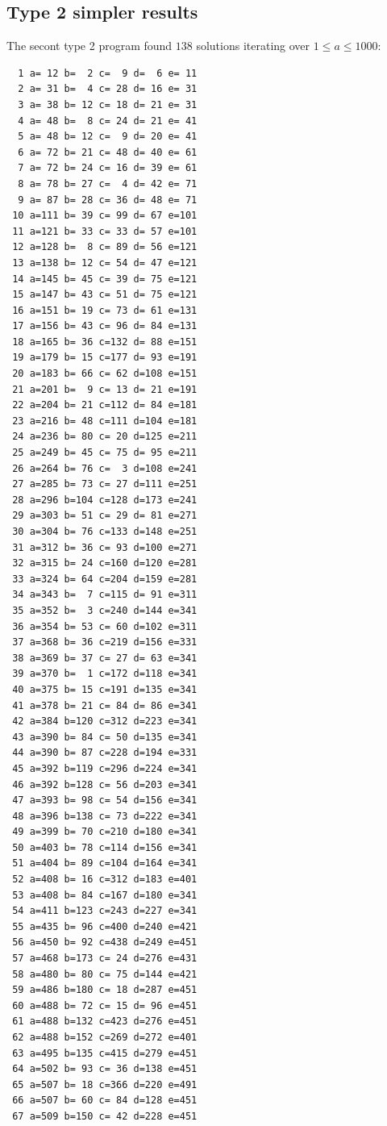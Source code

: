 \documentclass[11pt]{article}
\begin{document}
\subsection{Type 2 simpler results}
The secont type 2 program found $138$ solutions iterating over $1 \leq a \leq 1000$: 
\begin{lstlisting}
  1 a= 12 b=  2 c=  9 d=  6 e= 11
  2 a= 31 b=  4 c= 28 d= 16 e= 31
  3 a= 38 b= 12 c= 18 d= 21 e= 31
  4 a= 48 b=  8 c= 24 d= 21 e= 41
  5 a= 48 b= 12 c=  9 d= 20 e= 41
  6 a= 72 b= 21 c= 48 d= 40 e= 61
  7 a= 72 b= 24 c= 16 d= 39 e= 61
  8 a= 78 b= 27 c=  4 d= 42 e= 71
  9 a= 87 b= 28 c= 36 d= 48 e= 71
 10 a=111 b= 39 c= 99 d= 67 e=101
 11 a=121 b= 33 c= 33 d= 57 e=101
 12 a=128 b=  8 c= 89 d= 56 e=121
 13 a=138 b= 12 c= 54 d= 47 e=121
 14 a=145 b= 45 c= 39 d= 75 e=121
 15 a=147 b= 43 c= 51 d= 75 e=121
 16 a=151 b= 19 c= 73 d= 61 e=131
 17 a=156 b= 43 c= 96 d= 84 e=131
 18 a=165 b= 36 c=132 d= 88 e=151
 19 a=179 b= 15 c=177 d= 93 e=191
 20 a=183 b= 66 c= 62 d=108 e=151
 21 a=201 b=  9 c= 13 d= 21 e=191
 22 a=204 b= 21 c=112 d= 84 e=181
 23 a=216 b= 48 c=111 d=104 e=181
 24 a=236 b= 80 c= 20 d=125 e=211
 25 a=249 b= 45 c= 75 d= 95 e=211
 26 a=264 b= 76 c=  3 d=108 e=241
 27 a=285 b= 73 c= 27 d=111 e=251
 28 a=296 b=104 c=128 d=173 e=241
 29 a=303 b= 51 c= 29 d= 81 e=271
 30 a=304 b= 76 c=133 d=148 e=251
 31 a=312 b= 36 c= 93 d=100 e=271
 32 a=315 b= 24 c=160 d=120 e=281
 33 a=324 b= 64 c=204 d=159 e=281
 34 a=343 b=  7 c=115 d= 91 e=311
 35 a=352 b=  3 c=240 d=144 e=341
 36 a=354 b= 53 c= 60 d=102 e=311
 37 a=368 b= 36 c=219 d=156 e=331
 38 a=369 b= 37 c= 27 d= 63 e=341
 39 a=370 b=  1 c=172 d=118 e=341
 40 a=375 b= 15 c=191 d=135 e=341
 41 a=378 b= 21 c= 84 d= 86 e=341
 42 a=384 b=120 c=312 d=223 e=341
 43 a=390 b= 84 c= 50 d=135 e=341
 44 a=390 b= 87 c=228 d=194 e=331
 45 a=392 b=119 c=296 d=224 e=341
 46 a=392 b=128 c= 56 d=203 e=341
 47 a=393 b= 98 c= 54 d=156 e=341
 48 a=396 b=138 c= 73 d=222 e=341
 49 a=399 b= 70 c=210 d=180 e=341
 50 a=403 b= 78 c=114 d=156 e=341
 51 a=404 b= 89 c=104 d=164 e=341
 52 a=408 b= 16 c=312 d=183 e=401
 53 a=408 b= 84 c=167 d=180 e=341
 54 a=411 b=123 c=243 d=227 e=341
 55 a=435 b= 96 c=400 d=240 e=421
 56 a=450 b= 92 c=438 d=249 e=451
 57 a=468 b=173 c= 24 d=276 e=431
 58 a=480 b= 80 c= 75 d=144 e=421
 59 a=486 b=180 c= 18 d=287 e=451
 60 a=488 b= 72 c= 15 d= 96 e=451
 61 a=488 b=132 c=423 d=276 e=451
 62 a=488 b=152 c=269 d=272 e=401
 63 a=495 b=135 c=415 d=279 e=451
 64 a=502 b= 93 c= 36 d=138 e=451
 65 a=507 b= 18 c=366 d=220 e=491
 66 a=507 b= 60 c= 84 d=128 e=451
 67 a=509 b=150 c= 42 d=228 e=451

\end{lstlisting}
\end{document}

